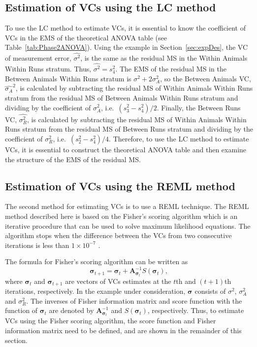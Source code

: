 \documentclass[12pt,a4paper]{article}
\newcommand{\A}{\mathbf{A}}
\begin{document}
\subsection{Estimation of VCs using the LC method} 
To use the LC method to estimate VCs, it is essential to know the coefficient of VCs in the EMS of the theoretical ANOVA table (see Table~\ref{tab:Phase2ANOVA}). Using the example in Section~\ref{sec:expDes}, the VC of measurement error, $\hat{\sigma^2}$, is the same as the residual MS in the Within Animals Within Runs stratum. Thus, $\hat{\sigma^2} = s_4^2.$  The EMS of the residual MS in the Between Animals Within Runs stratum is $\sigma^2 + 2\sigma_A^2$, so the Between Animals VC, $\hat{\sigma_A}^2$, is calculated by subtracting the residual MS of Within Animals Within Runs stratum from the residual MS of Between Animals Within Runs stratum and dividing by the coefficient of $\sigma_A^2$, i.e.\ $(s_3^2 - s_4^2)/2$. Finally, the Between Runs VC, $\hat{\sigma_R^2}$, is calculated by subtracting the residual MS of Within Animals Within Runs stratum from the residual MS of Between Runs stratum and dividing by the coefficient of $\sigma_R^2$, i.e.\ $(s_2^2 - s_4^2)/4.$ Therefore, to use the LC method to estimate VCs, it is essential to construct the theoretical ANOVA table and then examine the structure of the EMS of the residual MS. 
  
\subsection{Estimation of VCs using the REML method}  
The second method for estimating VCs is to use a REML technique. The REML method described here is based on the Fisher's scoring algorithm which is an iterative procedure that can be used to solve maximum likelihood equations. The algorithm stops when the difference between the VCs from two consecutive iterations is less than $1 \times 10^{-7}$ \citep{Patterson1971}. 

The formula for Fisher's scoring algorithm can be written as 
\begin{equation}\label{eq:fisherScore}
\bm{\sigma}_{t+1}= \bm{\sigma}_t+\A^{-1}_{\bm{\sigma}_t}S(\bm{\sigma}_t),
\end{equation}
where $\bm{\sigma}_{t}$ and $\bm{\sigma}_{t+1}$ are vectors of VCs estimates at the $t$th and $(t+1)$th iterations, respectively. In the example under consideration, $\bm{\sigma}$ consists of $\sigma^2$, $\sigma_A^2$ and $\sigma_R^2$. The inverses of Fisher information matrix and score function with the function of $\bm{\sigma}_t$ are denoted by $\A^{-1}_{\bm{\sigma}_t}$ and $S(\bm{\sigma}_t )$, respectively. Thus, to estimate VCs using the Fisher scoring algorithm, the score function and Fisher information matrix need to be defined, and are shown in the remainder of this section. 
\end{document}

